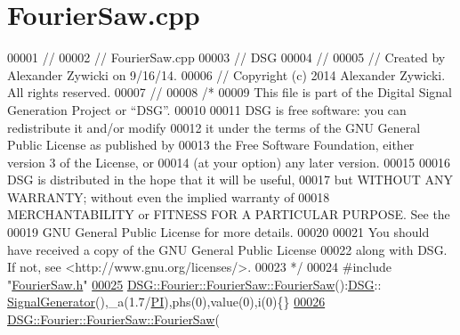 \hypertarget{_fourier_saw_8cpp_source}{\section{Fourier\+Saw.\+cpp}
\label{_fourier_saw_8cpp_source}
}

\begin{DoxyCode}
00001 \textcolor{comment}{//}
00002 \textcolor{comment}{//  FourierSaw.cpp}
00003 \textcolor{comment}{//  DSG}
00004 \textcolor{comment}{//}
00005 \textcolor{comment}{//  Created by Alexander Zywicki on 9/16/14.}
00006 \textcolor{comment}{//  Copyright (c) 2014 Alexander Zywicki. All rights reserved.}
00007 \textcolor{comment}{//}
00008 \textcolor{comment}{/*}
00009 \textcolor{comment}{ This file is part of the Digital Signal Generation Project or “DSG”.}
00010 \textcolor{comment}{}
00011 \textcolor{comment}{ DSG is free software: you can redistribute it and/or modify}
00012 \textcolor{comment}{ it under the terms of the GNU General Public License as published by}
00013 \textcolor{comment}{ the Free Software Foundation, either version 3 of the License, or}
00014 \textcolor{comment}{ (at your option) any later version.}
00015 \textcolor{comment}{}
00016 \textcolor{comment}{ DSG is distributed in the hope that it will be useful,}
00017 \textcolor{comment}{ but WITHOUT ANY WARRANTY; without even the implied warranty of}
00018 \textcolor{comment}{ MERCHANTABILITY or FITNESS FOR A PARTICULAR PURPOSE.  See the}
00019 \textcolor{comment}{ GNU General Public License for more details.}
00020 \textcolor{comment}{}
00021 \textcolor{comment}{ You should have received a copy of the GNU General Public License}
00022 \textcolor{comment}{ along with DSG.  If not, see <http://www.gnu.org/licenses/>.}
00023 \textcolor{comment}{ */}
00024 \textcolor{preprocessor}{#include "\hyperlink{_fourier_saw_8h}{FourierSaw.h}"}
\hypertarget{_fourier_saw_8cpp_source_l00025}{}\hyperlink{class_d_s_g_1_1_fourier_1_1_fourier_saw_acfef03c4384ef656110c51102e346c49}{00025} \hyperlink{class_d_s_g_1_1_fourier_1_1_fourier_saw_acfef03c4384ef656110c51102e346c49}{DSG::Fourier::FourierSaw::FourierSaw}():\hyperlink{namespace_d_s_g}{DSG}::
      \hyperlink{class_d_s_g_1_1_signal_generator}{SignalGenerator}(),\_a(1.7/\hyperlink{_p_i_8h_a598a3330b3c21701223ee0ca14316eca}{PI}),phs(0),value(0),i(0)\{\}
\hypertarget{_fourier_saw_8cpp_source_l00026}{}\hyperlink{class_d_s_g_1_1_fourier_1_1_fourier_saw_a6062c388900f32e1cfd6df95b9760065}{00026} \hyperlink{class_d_s_g_1_1_fourier_1_1_fourier_saw_acfef03c4384ef656110c51102e346c49}{DSG::Fourier::FourierSaw::FourierSaw}(

\end{DoxyCode}
